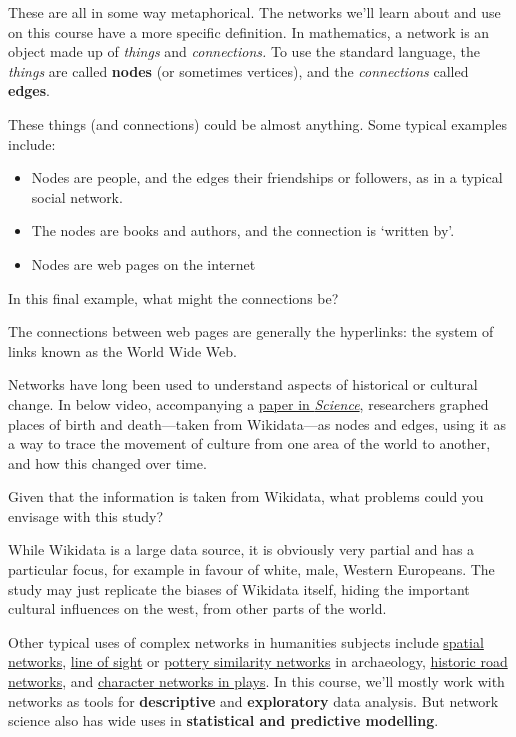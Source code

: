 \documentclass[
]{book}
\begin{document}
These are all in some way metaphorical. The networks we'll learn about and use on this course have a more specific definition. In mathematics, a network is an object made up of \emph{things} and \emph{connections.} To use the standard language, the \emph{things} are called \textbf{nodes} (or sometimes vertices), and the \emph{connections} called \textbf{edges}.

These things (and connections) could be almost anything. Some typical examples include:

\begin{itemize}
\item
  Nodes are people, and the edges their friendships or followers, as in a typical social network.
\item
  The nodes are books and authors, and the connection is `written by'.
\item
  Nodes are web pages on the internet
\end{itemize}

In this final example, what might the connections be?

The connections between web pages are generally the hyperlinks: the system of links known as the World Wide Web.

Networks have long been used to understand aspects of historical or cultural change. In below video, accompanying a \href{https://www.science.org/doi/10.1126/science.1240064}{paper in \emph{Science}}, researchers graphed places of birth and death---taken from Wikidata---as nodes and edges, using it as a way to trace the movement of culture from one area of the world to another, and how this changed over time.

Given that the information is taken from Wikidata, what problems could you envisage with this study?

While Wikidata is a large data source, it is obviously very partial and has a particular focus, for example in favour of white, male, Western Europeans. The study may just replicate the biases of Wikidata itself, hiding the important cultural influences on the west, from other parts of the world.

Other typical uses of complex networks in humanities subjects include \href{https://model-articles.rrchnm.org/articles/midura/}{spatial networks}, \href{https://www.frontiersin.org/articles/10.3389/fdigh.2017.00017/full}{line of sight} or \href{https://academic.oup.com/book/40384/chapter-abstract/347130019?redirectedFrom=fulltext}{pottery similarity networks} in archaeology, \href{https://www.landesgeschichte.uni-goettingen.de/handelsstrassen/index.php}{historic road networks}, and \href{http://www.martingrandjean.ch/network-visualization-shakespeare/}{character networks in plays}. In this course, we'll mostly work with networks as tools for \textbf{descriptive} and \textbf{exploratory} data analysis. But network science also has wide uses in \textbf{statistical and predictive modelling}.
\end{document}
